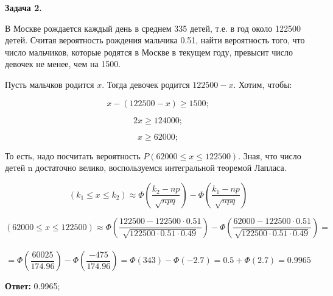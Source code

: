 \documentclass[]{article}
\begin{document}
	\vspace{10pt}
	
	\vspace{20pt}
	
	\centering
	\textbf{Задача 2.}
	
	\vspace{10pt}
	
	\raggedright
	\large
	
	В Москве рождается каждый день в среднем 335 детей, т.е. в год около
	122500 детей. Считая вероятность рождения мальчика 0.51, найти вероятность того, что число
	мальчиков, которые родятся в Москве в текущем году, превысит число девочек не менее, чем
	на 1500.
	
	\vspace{20pt}
	
	Пусть мальчков родится $x$. Тогда девочек родится $122500 - x$. Хотим, чтобы:
	
	\begin{equation}
	x - (122500 - x) \geq 1500;
	\end{equation}
	
	\begin{equation}
	2x \geq 124000;
	\end{equation}
	
	\begin{equation}
	x \geq 62000;
	\end{equation}
	
	\vspace{10pt}
	
	То есть, надо посчитать вероятность $P(62000 \leq x \leq 122500)$. Зная, что число детей n достаточно велико, воспользуемся интегральной теоремой Лапласа.
	
	\begin{equation}
	(k_1 \leq x \leq k_2) \approx \Phi (\frac{k_2 - np}{\sqrt{npq}}) - \Phi (\frac{k_1 - np}{\sqrt{npq}})
	\end{equation}
	
	\vspace{10pt}
	
	$$(62000 \leq x \leq 122500) \approx \Phi (\frac{122500 - 122500 \cdot 0.51}{\sqrt{122500 \cdot 0.51 \cdot 0.49}}) - \Phi (\frac{62000 - 122500 \cdot 0.51}{\sqrt{122500 \cdot 0.51 \cdot 0.49}}) = $$\\
	
	$$ = \Phi(\frac{60025}{174.96}) - \Phi(\frac{-475}{174.96}) = \Phi(343) - \Phi(-2.7) = 0.5 + \Phi(2.7) =  0.9965$$
	
	\vspace{10pt}
	
	\textbf{Ответ:} 0.9965;
	
\end{document}

